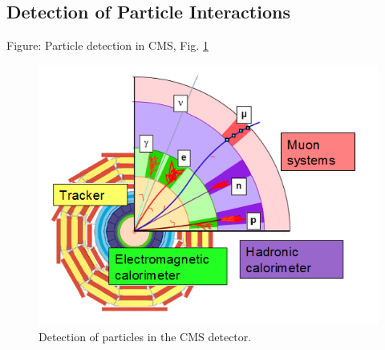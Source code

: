 \subsection{Detection of Particle Interactions}
Figure: Particle detection in CMS, Fig. \ref{fig:CMSParticles}

 \begin{figure}[htb]
  \begin{center}
    \includegraphics[width=360pt]{Figures/CMSParticles.png}
  \end{center}
  \caption[Detection of particles in the CMS detector]{Detection of particles in the CMS detector.}
  \label{fig:CMSParticles}
 \end{figure}


